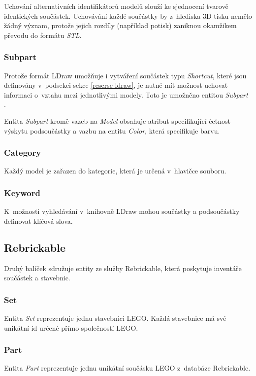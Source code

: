 Uchování alternativních identifikátorů modelů slouží ke sjednocení tvarově identických součástek. Uchovávání každé součástky by z~hlediska 3D tisku nemělo žádný význam, protože jejich rozdíly (například potisk) zaniknou okamžikem převodu do formátu \textit{STL}.

\subsubsection*{Subpart}
Protože formát LDraw umožňuje i vytváření součástek typu \textit{Shortcut}, které jsou definovány v~podsekci  sekce \ref{reserse-ldraw}, je nutné mít možnost uchovat informaci o~vztahu mezi jednotlivými modely. Toto je umožněno entitou \textit{Subpart} . 

Entita \textit{Subpart} kromě vazeb na \textit{Model} obsahuje atribut specifikující četnost výskytu podsoučástky a vazbu na entitu \textit{Color}, která specifikuje barvu. 

\subsubsection*{Category}
Každý model je zařazen do kategorie, která je určená v~hlavičce souboru.

\subsubsection*{Keyword}
K~možnosti vyhledávání v~knihovně LDraw mohou součástky a podsoučástky definovat klíčová slova.

\subsection{Rebrickable}
Druhý balíček sdružuje entity ze služby Rebrickable, která poskytuje inventáře součástek a stavebnic.

\subsubsection*{Set}
Entita \textit{Set} reprezentuje jednu stavebnici LEGO. Každá stavebnice má své unikátní id určené přímo společností LEGO. 

\subsubsection*{Part}
Entita \textit{Part} reprezentuje jednu unikátní součásku LEGO z~databáze Rebrickable.

